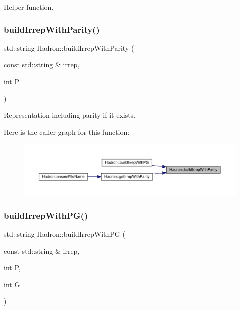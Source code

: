 Helper function. 

\mbox{\label{namespaceHadron_a036614bb88af01a4308fe463a99f5b12}} 
\subsubsection{\texorpdfstring{buildIrrepWithParity()}{buildIrrepWithParity()}}
{\footnotesize\ttfamily std\+::string Hadron\+::build\+Irrep\+With\+Parity (\begin{DoxyParamCaption}\item[{const std\+::string \&}]{irrep,  }\item[{int}]{P }\end{DoxyParamCaption})}



Representation including parity if it exists. 

Here is the caller graph for this function\+:\nopagebreak
\begin{figure}[H]
\begin{center}
\leavevmode
\includegraphics[width=350pt]{d1/daf/namespaceHadron_a036614bb88af01a4308fe463a99f5b12_icgraph}
\end{center}
\end{figure}
\mbox{\label{namespaceHadron_a45b2852ba4456b8729474ced77a3615f}} 
\subsubsection{\texorpdfstring{buildIrrepWithPG()}{buildIrrepWithPG()}}
{\footnotesize\ttfamily std\+::string Hadron\+::build\+Irrep\+With\+PG (\begin{DoxyParamCaption}\item[{const std\+::string \&}]{irrep,  }\item[{int}]{P,  }\item[{int}]{G }\end{DoxyParamCaption})}



